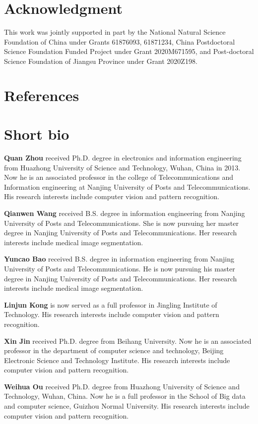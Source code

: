 \documentclass[review]{elsarticle}
\begin{document}
\section*{Acknowledgment}

This work was jointly supported in part by the National Natural Science Foundation of China under Grants 61876093, 61871234, China Postdoctoral Science Foundation Funded Project under Grant 2020M671595, and Post-doctoral Science Foundation of Jiangsu Province under Grant 2020Z198.

\section*{References}



\section*{Short bio}

\textbf{Quan Zhou} received Ph.D. degree in electronics and information engineering from Huazhong University of Science and Technology, Wuhan, China in 2013. Now he is an associated professor in the college of Telecommunications and Information engineering at Nanjing University of Posts and Telecommunications. His research interests include computer vision and pattern recognition.

\textbf{Qianwen Wang} received B.S. degree in information engineering from Nanjing University of Posts and Telecommunications. She is now pursuing her master degree in Nanjing University of Posts and Telecommunications. Her research interests include medical image segmentation.

\textbf{Yuncao Bao} received B.S. degree in information engineering from Nanjing University of Posts and Telecommunications. He is now pursuing his master degree in Nanjing University of Posts and Telecommunications. Her research interests include medical image segmentation.

\textbf{Linjun Kong} is now served as a full professor in Jingling Institute of Technology. His research interests include  computer vision and pattern recognition.

\textbf{Xin Jin} received Ph.D. degree from Beihang University. Now he is an associated professor in the department of computer science and technology, Beijing Electronic Science and Technology Institute. His research interests include computer vision and pattern recognition.

\textbf{Weihua Ou} received Ph.D. degree from Huazhong University of Science and Technology, Wuhan, China. Now he is a full professor in the School of Big data and computer science, Guizhou Normal University. His research interests include computer vision and pattern recognition.
\end{document}
